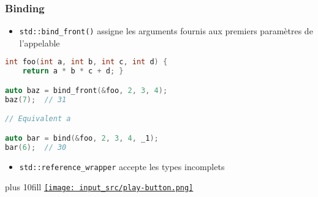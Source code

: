 \documentclass[C++.tex]{subfiles}
\begin{document}
\begin{frame}[fragile]
	\frametitle{Binding}
	\begin{itemize}
		\item \lstinline|std::bind_front()| assigne les arguments fournis aux premiers paramètres de l'appelable
	\end{itemize}

	\begin{lstlisting}[language=C++]
int foo(int a, int b, int c, int d) {
	return a * b * c + d; }

auto baz = bind_front(&foo, 2, 3, 4);
baz(7);  // 31

// Equivalent a

auto bar = bind(&foo, 2, 3, 4, _1);
bar(6);  // 30\end{lstlisting}

	\begin{itemize}
		\item \lstinline|std::reference_wrapper| accepte les types incomplets

	\end{itemize}

	\vskip 10mm plus 10fill
	\hfill
	\href{https://godbolt.org/#g:!((g:!((g:!((h:codeEditor,i:(filename:'1',fontScale:14,fontUsePx:'0',j:1,lang:c%2B%2B,selection:(endColumn:1,endLineNumber:19,positionColumn:1,positionLineNumber:19,selectionStartColumn:1,selectionStartLineNumber:19,startColumn:1,startLineNumber:19),source:'%23include+%3Cfunctional%3E%0A%23include+%3Ciostream%3E%0A%0Aint+foo(int+a,+int+b,+int+c,+int+d)%0A%7B%0A++return+a+*+b+*+c+%2B+d%3B%0A%7D%0A%0Aint+main()%0A%7B%0A++std::cout+%3C%3C+foo(2,+3,+4,+5)+%3C%3C+%22%5Cn%22%3B%0A%0A++auto+bar+%3D+std::bind(%26foo,+2,+3,+4,+std::placeholders::_1)%3B%0A++std::cout+%3C%3C+bar(6)+%3C%3C+%22%5Cn%22%3B%0A%0A++auto+baz+%3D+std::bind_front(%26foo,+2,+3,+4)%3B%0A++std::cout+%3C%3C+baz(7)+%3C%3C+%22%5Cn%22%3B%0A%7D%0A'),l:'5',n:'0',o:'C%2B%2B+source+%231',t:'0')),k:50,l:'4',n:'0',o:'',s:0,t:'0'),(g:!((h:executor,i:(argsPanelShown:'1',compilationPanelShown:'0',compiler:g112,compilerOutShown:'0',execArgs:'',execStdin:'',fontScale:14,fontUsePx:'0',j:1,lang:c%2B%2B,libs:!((name:boost,ver:'175')),options:'-std%3Dc%2B%2B20',source:1,stdinPanelShown:'1',tree:'1',wrap:'0'),l:'5',n:'0',o:'Executor+x86-64+gcc+11.2+(C%2B%2B,+Editor+%231)',t:'0')),header:(),k:50,l:'4',n:'0',o:'',s:0,t:'0')),l:'2',n:'0',o:'',t:'0')),version:4}{\texttt{[image: input\_src/play-button.png]}}
\end{frame}
\end{document}

